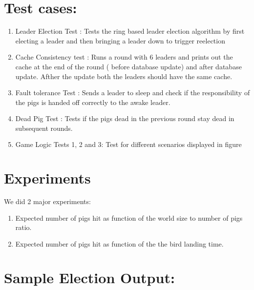 \documentclass[]{article}
\begin{document}
\section{Test cases:}
\begin{enumerate}
\item Leader Election Test : Tests the ring based leader election algorithm by first electing a leader and then bringing a leader down to trigger reelection 
\item Cache Consistency test : Runs a round with 6 leaders and prints out the cache at the end of the round ( before database update) and after database update. Afther the update both the leaders should have the same cache.
\item Fault tolerance Test : Sends a leader to sleep and check if the responsibility of the pigs is handed off correctly to the awake leader. 
\item Dead Pig Test : Tests if the pigs dead in the previous round stay dead in subsequent rounds.
\item Game Logic Tests 1, 2 and 3: Test for different scenarios displayed in figure 
\end{enumerate}



\section{Experiments}
We did 2 major experiments:
\begin{enumerate}[1.]
\item
  Expected number of pigs hit as function of the world size to number of pigs ratio.
\item
  Expected number of pigs hit as function of the the bird landing time.
\end{enumerate} 

\section{Sample Election Output:}
\end{document}
